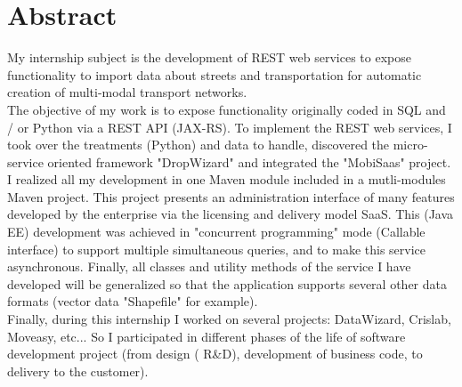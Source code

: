 \chapter*{Abstract}

My internship subject is the development of REST web services to expose functionality to import data about streets and transportation for automatic creation of multi-modal transport networks.\\

The objective of my work is to expose functionality originally coded in SQL and / or Python via a REST API (JAX-RS). To implement the REST web services, I took over the treatments (Python) and data to handle, discovered the micro-service oriented framework "DropWizard" and integrated the "MobiSaas" project. I realized all my development in one Maven module included in a mutli-modules Maven project. This project presents an administration interface of many features developed by the enterprise via the licensing and delivery model SaaS. This (Java EE) development was achieved in "concurrent programming" mode (Callable interface) to support multiple simultaneous queries, and to make this service asynchronous. Finally, all classes and utility methods of the service I have developed will be generalized so that the application supports several other data formats (vector data "Shapefile" for example).\\

Finally, during this internship I worked on several projects: DataWizard, Crislab, Moveasy, etc... So I participated in different phases of the life of software development project (from design ( R\&D), development of business code, to delivery to the customer).\\